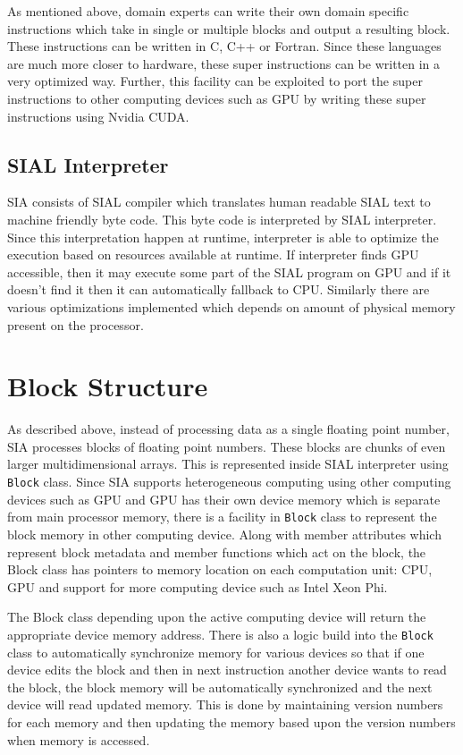 As mentioned above, domain experts can write their own domain specific
instructions which take in single or multiple blocks and output a resulting block. These
instructions can be written in C, C++ or Fortran. Since these languages are much
more closer to hardware, these super instructions can be written in a very
optimized way. Further, this facility can be exploited to port the super instructions to
other computing devices such as GPU by writing these super instructions using
Nvidia CUDA.

\subsection{SIAL Interpreter}
SIA consists of SIAL compiler which translates human readable SIAL text to
machine friendly byte code. This byte code is interpreted by SIAL interpreter.
Since this interpretation happen at runtime, interpreter is able to optimize the
execution based on resources available at runtime. If interpreter finds GPU
accessible, then it may execute some part of the SIAL program on GPU and if it
doesn't find it then it can automatically fallback to CPU. Similarly there are
various optimizations implemented which depends on amount of physical memory
present on the processor.

\section{Block Structure}
As described above, instead of processing data as a single floating point
number, SIA processes blocks of floating point numbers. These blocks are chunks
of even larger multidimensional arrays. This is represented inside SIAL
interpreter using \texttt{Block} class. Since SIA supports heterogeneous computing
using other computing devices such as GPU and GPU has their own device memory
which is separate from main processor memory, there is a facility in
\texttt{Block} class to represent the block memory in other
computing device. Along with member attributes which represent block metadata
and member functions which act on the block, the Block class has pointers to
memory location on each computation unit: CPU, GPU and support for more
computing device such as Intel Xeon Phi.

The Block class depending upon the active computing device will return the
appropriate device memory address. There is also a logic build into the \texttt{Block}
class to automatically synchronize memory for various devices so that if one
device edits the block and then in next instruction another device wants
to read the block, the block memory will be automatically synchronized and the
next device will read updated memory. This is done by maintaining version numbers
for each memory and then updating the memory based upon the version numbers when
memory is accessed.

